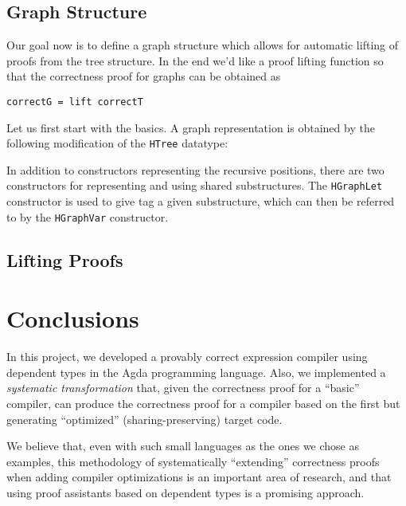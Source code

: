 \documentclass[a4paper]{article}
\begin{document}
        \subsection{Graph Structure}
        
        Our goal now is to define a graph structure which allows for automatic lifting of proofs from the tree structure. In the end we'd like a proof lifting
        function so that the correctness proof for graphs can be obtained as
        \begin{verbatim}
correctG = lift correctT
        \end{verbatim}
        
        Let us first start with the basics. A graph representation is obtained by the following modification of the \texttt{HTree} datatype:
        
        
        In addition to constructors representing the recursive positions, there are two constructors for representing and using shared substructures.
        The \texttt{HGraphLet} constructor is used to give tag a given substructure, which can then be referred to by the \texttt{HGraphVar} constructor. 
        
        
        \subsection{Lifting Proofs}
        
        
        
        
        
        
    \section{Conclusions}
    \label{sec:conclusions}
        In this project, we developed a provably correct expression compiler using dependent types in the Agda programming language.
        Also, we implemented a \emph{systematic transformation} that, given the correctness proof for
        a ``basic'' compiler, can produce the correctness proof for a compiler based on the first but
        generating ``optimized'' (sharing-preserving) target code.

        We believe that, even with such small languages as the ones we chose as examples,
        this methodology of systematically ``extending'' correctness proofs when adding compiler optimizations
        is an important area of research, and that using proof assistants based on dependent types is a
        promising approach.
\end{document}
